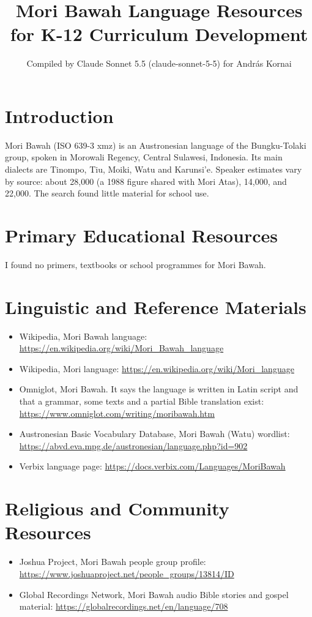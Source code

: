 \documentclass[12pt]{article}
\title{Mori Bawah Language Resources for K-12 Curriculum Development}
\author{Compiled by Claude Sonnet 5.5 (claude-sonnet-5-5) for Andr\'as Kornai}
\date{}
\begin{document}
\maketitle

\section{Introduction}
Mori Bawah (ISO 639-3 xmz) is an Austronesian language of the Bungku-Tolaki group, spoken in Morowali Regency, Central Sulawesi, Indonesia. Its main dialects are Tinompo, Tiu, Moiki, Watu and Karunsi'e. Speaker estimates vary by source: about 28,000 (a 1988 figure shared with Mori Atas), 14,000, and 22,000. The search found little material for school use.

\section{Primary Educational Resources}
I found no primers, textbooks or school programmes for Mori Bawah.

\section{Linguistic and Reference Materials}
\begin{itemize}
\item Wikipedia, Mori Bawah language: \url{https://en.wikipedia.org/wiki/Mori_Bawah_language}
\item Wikipedia, Mori language: \url{https://en.wikipedia.org/wiki/Mori_language}
\item Omniglot, Mori Bawah. It says the language is written in Latin script and that a grammar, some texts and a partial Bible translation exist: \url{https://www.omniglot.com/writing/moribawah.htm}
\item Austronesian Basic Vocabulary Database, Mori Bawah (Watu) wordlist: \url{https://abvd.eva.mpg.de/austronesian/language.php?id=902}
\item Verbix language page: \url{https://docs.verbix.com/Languages/MoriBawah}
\end{itemize}

\section{Religious and Community Resources}
\begin{itemize}
\item Joshua Project, Mori Bawah people group profile: \url{https://www.joshuaproject.net/people_groups/13814/ID}
\item Global Recordings Network, Mori Bawah audio Bible stories and gospel material: \url{https://globalrecordings.net/en/language/708}
\end{itemize}
\end{document}
